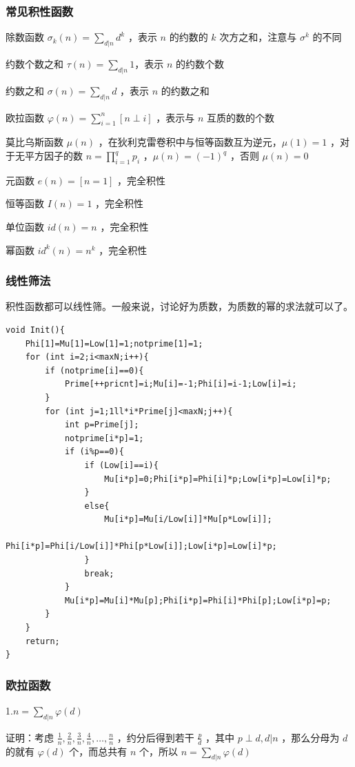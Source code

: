 \documentclass[UTF-8]{ctexart}
\begin{document}
	\subsubsection{常见积性函数}
	除数函数 $\sigma _ k (n)=\sum _ {d|n} d ^ k$ ，表示 $n$ 的约数的 $k$ 次方之和，注意与 $\sigma ^ k$ 的不同   
	
	约数个数之和 $\tau(n)=\sum _ {d|n} 1$，表示 $n$  的约数个数  
	
	约数之和 $\sigma(n)=\sum _ {d|n} d$ ，表示 $n$  的约数之和  
	
	欧拉函数 $\varphi(n)=\sum _ {i=1} ^ n [n \perp i]$ ，表示与 $n$ 互质的数的个数  
	
	莫比乌斯函数 $\mu(n)$ ，在狄利克雷卷积中与恒等函数互为逆元，$\mu(1)=1$ ，对于无平方因子的数 $n=\prod _ {i=1} ^ q p _ i$ ，$\mu(n)=(-1) ^ q$ ，否则 $\mu(n)=0$  
	
	元函数 $e(n)=[n=1]$ ，完全积性  
	
	恒等函数 $I(n)=1$ ，完全积性  
	
	单位函数 $id(n)=n$ ，完全积性  
	
	幂函数 $id ^ k (n)=n ^ k$ ，完全积性
	\subsubsection{线性筛法}
	积性函数都可以线性筛。一般来说，讨论好为质数，为质数的幂的求法就可以了。
\begin{verbatim}
void Init(){
    Phi[1]=Mu[1]=Low[1]=1;notprime[1]=1;
    for (int i=2;i<maxN;i++){
        if (notprime[i]==0){
            Prime[++pricnt]=i;Mu[i]=-1;Phi[i]=i-1;Low[i]=i;
        }
        for (int j=1;1ll*i*Prime[j]<maxN;j++){
            int p=Prime[j];
            notprime[i*p]=1;
            if (i%p==0){
                if (Low[i]==i){
                    Mu[i*p]=0;Phi[i*p]=Phi[i]*p;Low[i*p]=Low[i]*p;
                }
                else{
                    Mu[i*p]=Mu[i/Low[i]]*Mu[p*Low[i]];
                    Phi[i*p]=Phi[i/Low[i]]*Phi[p*Low[i]];Low[i*p]=Low[i]*p;
                }
                break;
            }
            Mu[i*p]=Mu[i]*Mu[p];Phi[i*p]=Phi[i]*Phi[p];Low[i*p]=p;
        }
    }
    return;
}
\end{verbatim}
	\subsubsection{欧拉函数}
	1.$n=\sum _ {d|n} \varphi(d)$
	
	证明：考虑 $\frac{1}{n},\frac{2}{n},\frac{3}{n},\frac{4}{n},\dots,\frac{n}{n}$ ，约分后得到若干 $\frac{p}{d}$ ，其中 $p \perp d,d|n$ ，那么分母为 $d$ 的就有 $\varphi(d)$ 个，而总共有 $n$ 个，所以 $n=\sum _ {d|n} \varphi(d)$
	
\end{document}
